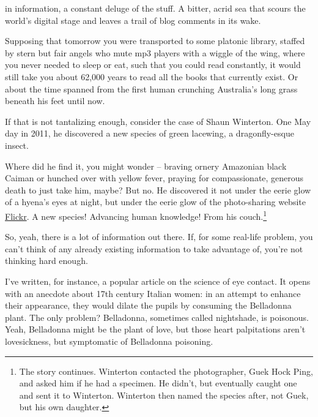  in information, a constant deluge of the
stuff. A bitter, acrid sea that scours the world's digital stage and leaves a
trail of blog comments in its wake.

Supposing that tomorrow you were transported to some platonic
library, staffed
by stern but fair angels who mute mp3 players with a wiggle of the wing, where
you never needed to sleep or eat, such that you could read constantly, it would
still take you about 62,000 years to read all the books that currently
exist. Or about the time spanned from the first human crunching Australia's
long grass
beneath his feet until
now.  

If that is not tantalizing enough, consider the case of Shaun Winterton. One May day in 2011, he discovered a new species of green lacewing, a dragonfly-esque insect.

Where did he find it, you might wonder -- braving ornery Amazonian black Caiman
or hunched over with yellow fever, praying for compassionate, generous death to just take him, maybe? But no. He discovered it not under the
eerie glow of a hyena's eyes at night, but under the eerie glow of the
photo-sharing website \href{https://www.flickr.com/}{Flickr}. A new species! Advancing human
knowledge! From his couch.\footnote{The story continues. Winterton contacted the photographer, Guek Hock Ping, and asked him
  if he had a specimen. He didn't, but eventually caught one and sent it to
  Winterton. Winterton then named the species after, not Guek, but his own daughter.}\cite{winterton2012charismatic}

So, yeah, there is a lot of information out there. If, for some real-life problem, you can't think of any already existing information to take advantage of, you're not thinking hard enough.

I've written, for instance, a popular article on the science of eye contact. It
opens with an anecdote about 17th century Italian women: in an attempt to
enhance their appearance, they would dilate the pupils by consuming the Belladonna plant. The only problem? Belladonna, sometimes called nightshade, is
poisonous. Yeah, Belladonna might be the plant of love, but those heart
palpitations aren't lovesickness, but symptomatic of Belladonna poisoning.

